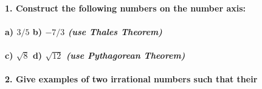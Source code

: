 \documentclass[11pt]{amsbook}
\begin{document}
\paragraph{}

\paragraph{\hspace{0.5cm}1. Construct the following numbers on the number axis:}

\paragraph{\hspace{1.5cm}a) $3/5$\hspace{2.6cm}	b) $-7/3$\hspace{0.6cm} \emph{(use Thales Theorem)}}

\paragraph{\hspace{1.5cm}c) $\sqrt{8}$\hspace{2.8cm}	d) $\sqrt{12}$ \hspace{0.8cm}\emph{(use Pythagorean Theorem)}}

\paragraph{}
\paragraph{\hspace{0.5cm}2. Give examples of two irrational numbers such that their}




\end{document}
